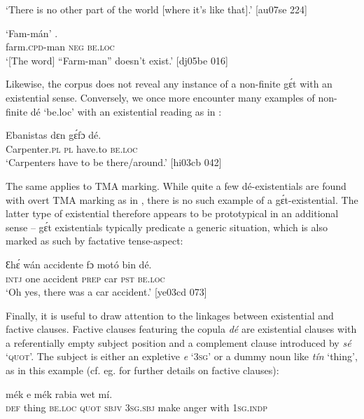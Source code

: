 \glt ‘There is no other part of the world [where it’s like that].’ [au07se 224]
\z


\ea%
    \label{ex:key:813}
    \gll ‘Fam-mán’    .\\
farm.\textsc{cpd}{}-man  \textsc{neg}  \textsc{be.loc}\\

\glt ‘[The word] “Farm-man” doesn’t exist.’ [dj05be 016]
\z

Likewise, the corpus does not reveal any instance of a non-finite gɛ́t with an existential sense. Conversely, we once more encounter many examples of non-finite dé ‘be.loc’ with an existential reading as in :


\ea%
    \label{ex:key:814}
    \gll Ebanistas  dɛn  gɛ́fɔ    dé.\\
Carpenter.\textsc{pl}  \textsc{pl}  have.to  \textsc{be.loc}\\

\glt ‘Carpenters have to be there/around.’ [hi03cb 042]
\z

The same applies to TMA marking. While quite a few dé-existentials are found with overt TMA marking as in , there is no such example of a gɛ́t-existential. The latter type of existential therefore appears to be prototypical in an additional sense – gɛ́t existentials typically predicate a generic situation, which is also marked as such by factative{\fff} tense-aspect:


\ea%
    \label{ex:key:815}
    \gll Ɛhɛ́  wán  accidente  fɔ  motó  bin  dé.\\
\textsc{intj}  one  accident    \textsc{prep}  car    \textsc{pst}  \textsc{be.loc}\\

\glt ‘Oh yes, there was a car accident.’ [ye03cd 073]
\z

Finally, it is useful to draw attention to the linkages between existential and factive clauses. Factive clauses featuring the copula \textit{dé} are existential clauses with a referentially empty subject position and a complement clause introduced by \textit{sé} ‘\textsc{quot}’. The subject is either an expletive \textit{e} ‘\textsc{3sg}’ or a dummy noun like \textit{tín} ‘thing’, as in this example (cf. eg.  for further details on factive clauses): 


\ea%
    \label{ex:key:816}
    \gll {}             mék    e    mék    rabia  wet    mí.\\
\textsc{def}  thing  \textsc{be.loc}  \textsc{quot}    \textsc{sbjv}    \textsc{3sg.sbj}  make  anger  with    \textsc{1sg.indp}\\

